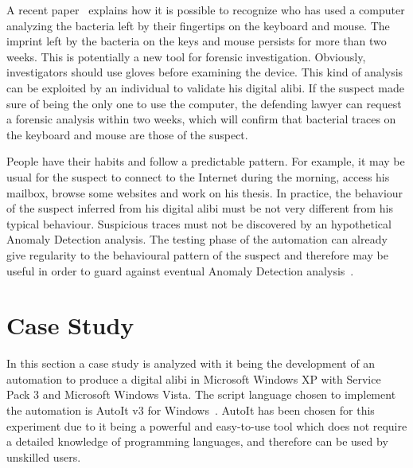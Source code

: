 \documentclass[runningheads]{llncs}
\begin{document}
A recent paper~\cite{bacterial} explains how it is possible to recognize who has used a computer analyzing the bacteria left by their fingertips on the keyboard and mouse. The imprint left by the bacteria on the keys and mouse persists for more than two weeks. This is potentially a new tool for forensic investigation. Obviously, investigators should use gloves before examining the device. This kind of analysis can be exploited by an individual to validate his digital alibi.
If the suspect made sure of being the only one to use the computer, the defending lawyer can request a forensic analysis within two weeks, which will confirm that bacterial traces on the keyboard and mouse are those of the suspect.

People have their habits and follow a predictable pattern. For example, it may be usual for the suspect to connect to the Internet during the morning, access his mailbox, browse some websites and work on his thesis. In practice, the behaviour of the suspect inferred from his digital alibi must be not very different from his typical behaviour. Suspicious traces must not be discovered by an hypothetical Anomaly Detection analysis.
The testing phase of the automation can already give regularity to the behavioural pattern of the suspect and therefore may be useful in order to guard against eventual Anomaly Detection analysis~\cite{Chandola}.

\section{Case Study}
\label{sec:CaseStudy}
In this section a case study is analyzed with it being the development of an automation to produce a digital alibi in Microsoft Windows XP with Service Pack 3 and Microsoft Windows Vista.
The script language chosen to implement the automation is AutoIt v3 for Windows~\cite{autoit}.
AutoIt has been chosen for this experiment due to it being a powerful and easy-to-use tool which does not require a detailed knowledge of programming languages, and therefore can be used by unskilled users.
\end{document}
